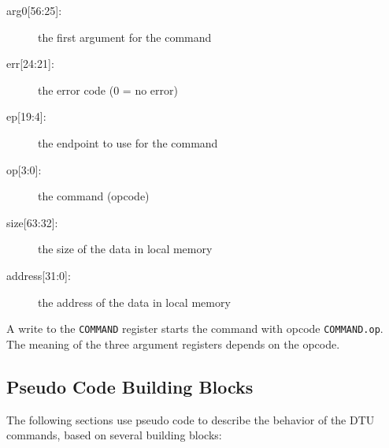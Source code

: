 \documentclass[a4paper,11pt,draft]{article}
\begin{document}
\begin{description}
  \item[arg0{[56:25]}:] the first argument for the command
  \item[err{[24:21]}:] the error code (0 = no error)
  \item[ep{[19:4]}:] the endpoint to use for the command
  \item[op{[3:0]}:] the command (opcode)
  \item[size{[63:32]}:] the size of the data in local memory
  \item[address{[31:0]}:] the address of the data in local memory
\end{description}

\noindent A write to the \texttt{COMMAND} register starts the command with opcode
\texttt{COMMAND.op}. The meaning of the three argument registers depends on the opcode.

\subsection{Pseudo Code Building Blocks}

The following sections use pseudo code to describe the behavior of the DTU commands, based on
several building blocks:
\end{document}
